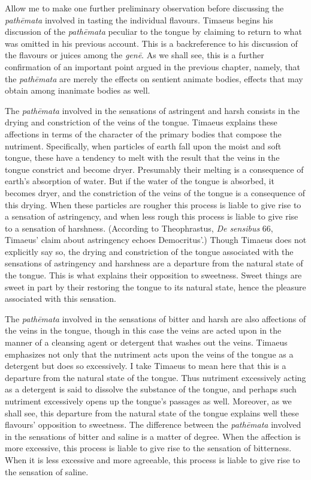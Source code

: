 Allow me to make one further preliminary observation before discussing the \emph{pathēmata} involved in tasting the individual flavours. Timaeus begins his discussion of the \emph{pathēmata} peculiar to the tongue by claiming to return to what was omitted in his previous account. This is a backreference to his discussion of the flavours or juices among the \emph{genē}. As we shall see, this is a further confirmation of an important point argued in the previous chapter, namely, that the \emph{pathēmata} are merely the effects on sentient animate bodies, effects that may obtain among inanimate bodies as well.

The \emph{pathēmata} involved in the sensations of astringent and harsh consists in the drying and constriction of the veins of the tongue. Timaeus explains these affections in terms of the character of the primary bodies that compose the nutriment. Specifically, when particles of earth fall upon the moist and soft tongue, these have a tendency to melt with the result that the veins in the tongue constrict and become dryer. Presumably their melting is a consequence of earth's absorption of water. But if the water of the tongue is absorbed, it becomes dryer, and the constriction of the veins of the tongue is a consequence of this drying. When these particles are rougher this process is liable to give rise to a sensation of astringency, and when less rough this process is liable to give rise to a sensation of harshness. (According to Theophrastus, \emph{De sensibus} 66, Timaeus' claim about astringency echoes Democritus'.) Though Timaeus does not explicitly say so, the drying and constriction of the tongue associated with the sensations of astringency and harshness are a departure from the natural state of the tongue. This is what explains their opposition to sweetness. Sweet things are sweet in part by their restoring the tongue to its natural state, hence the pleasure associated with this sensation. 

The \emph{pathēmata} involved in the sensations of bitter and harsh are also affections of the veins in the tongue, though in this case the veins are acted upon in the manner of a cleansing agent or detergent that washes out the veins. Timaeus emphasizes not only that the nutriment acts upon the veins of the tongue as a detergent but does so excessively. I take Timaeus to mean here that this is a departure from the natural state of the tongue. Thus nutriment excessively acting as a detergent is said to dissolve the substance of the tongue, and perhaps such nutriment excessively opens up the tongue's passages as well. Moreover, as we shall see, this departure from the natural state of the tongue explains well these flavours' opposition to sweetness. The difference between the \emph{pathēmata} involved in the sensations of bitter and saline is a matter of degree. When the affection is more excessive, this process is liable to give rise to the sensation of bitterness. When it is less excessive and more agreeable, this process is liable to give rise to the sensation of saline.

